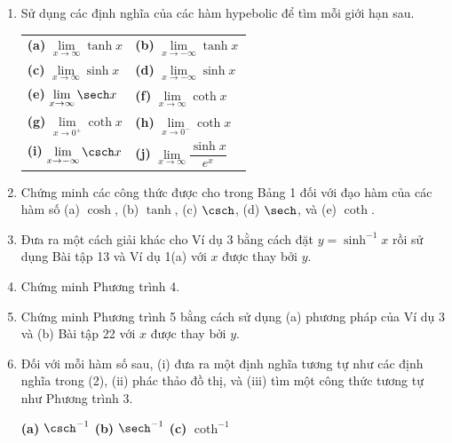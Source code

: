 \begin{minipage}[t]{0.48\textwidth}
\begin{enumerate}[label=\textbf{\arabic*.}, leftmargin=1.8em, itemsep=2.5pt, topsep=0pt]
\item Sử dụng các định nghĩa của các hàm hypebolic để tìm mỗi giới hạn sau.
\par\vspace{2pt}
\noindent
\begin{tabular}{@{}p{0.48\linewidth}@{}p{0.52\linewidth}@{}}
\textbf{(a)}\; $\lim\limits_{x\to\infty} \tanh x$ & \textbf{(b)}\; $\lim\limits_{x\to-\infty} \tanh x$ \\[5pt]
\textbf{(c)}\; $\lim\limits_{x\to\infty} \sinh x$ & \textbf{(d)}\; $\lim\limits_{x\to-\infty} \sinh x$ \\[5pt]
\textbf{(e)}\; $\lim\limits_{x\to\infty} \sech x$ & \textbf{(f)}\; $\lim\limits_{x\to\infty} \coth x$ \\[5pt]
\textbf{(g)}\; $\lim\limits_{x\to 0^+} \coth x$ & \textbf{(h)}\; $\lim\limits_{x\to 0^-} \coth x$ \\[5pt]
\textbf{(i)}\; $\lim\limits_{x\to-\infty} \csch x$ & \textbf{(j)}\; $\lim\limits_{x\to\infty} \dfrac{\sinh x}{e^x}$
\end{tabular}

\item Chứng minh các công thức được cho trong Bảng 1 đối với đạo hàm của các hàm số (a) $\cosh$, (b) $\tanh$, (c) $\csch$, (d) $\sech$, và (e) $\coth$.

\item Đưa ra một cách giải khác cho Ví dụ 3 bằng cách đặt $y = \sinh^{-1}x$ rồi sử dụng Bài tập 13 và Ví dụ 1(a) với $x$ được thay bởi $y$.

\item Chứng minh Phương trình 4.

\item Chứng minh Phương trình 5 bằng cách sử dụng (a) phương pháp của Ví dụ 3 và (b) Bài tập 22 với $x$ được thay bởi $y$.

\item Đối với mỗi hàm số sau, (i) đưa ra một định nghĩa tương tự như các định nghĩa trong (2), (ii) phác thảo đồ thị, và (iii) tìm một công thức tương tự như Phương trình 3.
\par\vspace{2pt}
\textbf{(a)}\; $\csch^{-1}$ \hfill \textbf{(b)}\; $\sech^{-1}$ \hfill \textbf{(c)}\; $\coth^{-1}$ \hspace*{2em}

\end{enumerate}
\end{minipage}%
\hfill
